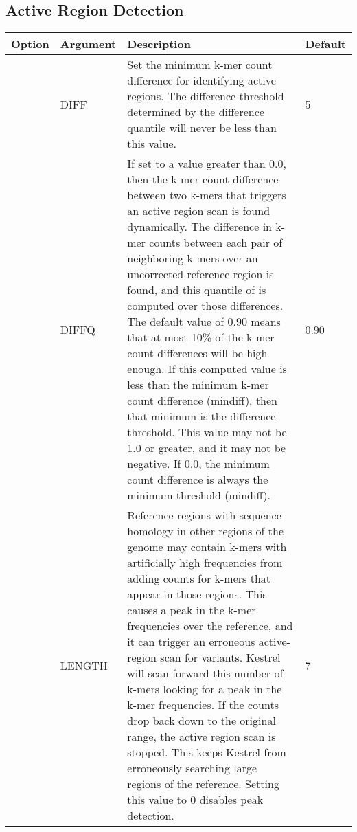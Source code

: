 

\subsection{Active Region Detection}
\label{sec.cmdline.opts.ardetect}

\begin{small}
	\begin{longtable}{|p{\optwidth}|p{\argwidth}|p{\dscwidth}|p{}|}
		\hline
		
		\textbf{Option} & \textbf{Argument} & \textbf{Description} & \textbf{Default} \\ \hline
		
		\lopt{mindiff} & DIFF &
		Set the minimum k-mer count difference for identifying active regions. The difference threshold determined by the difference quantile will never be less than this value.
		& 5
		\\ \hline
		
		\lopt{diffq} & DIFFQ &
		If set to a value greater than 0.0, then the k-mer count difference between two k-mers that triggers an active region scan is found dynamically. The difference in k-mer counts between each pair of neighboring k-mers over an uncorrected reference region is found, and this quantile of is computed over those differences. The default value of 0.90 means that at most 10\% of the k-mer count differences will be high enough. If this computed value is less than the minimum k-mer count difference (\ddash{}mindiff), then that minimum is the difference threshold. This value may not be 1.0 or greater, and it may not be negative. If 0.0, the minimum count difference is always the minimum threshold (\ddash{}mindiff).
		& 0.90
		\\ \hline
		
		\lopt{peakscan} & LENGTH &
		Reference regions with sequence homology in other regions of the genome may contain k-mers with artificially high frequencies from adding counts for k-mers that appear in those regions. This causes a peak in the k-mer frequencies over the reference, and it can trigger an erroneous active-region scan for variants. Kestrel will scan forward this number of k-mers looking for a peak in the k-mer frequencies. If the counts drop back down to the original range, the active region scan is stopped. This keeps Kestrel from erroneously searching large regions of the reference. Setting this value to 0 disables peak detection.
		& 7
		\\ \hline
		

\end{longtable}
\end{small}
